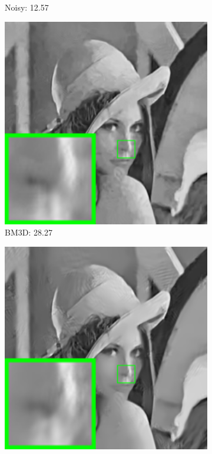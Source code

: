 \begin{figure}
\begin{adjustwidth}{-2cm}{}
\begin{subfigure}[t]{0.19\textwidth}
		\caption{Noisy: 12.57}
    \end{subfigure}
    \hfill
    \begin{subfigure}[t]{0.19\textwidth}
        \centering
        \includegraphics[width=1\textwidth]{images/twsc/awgn/resize_br_BM3D_60_lena.png}
		\caption{BM3D: 28.27}
    \end{subfigure}
    \hfill
    \begin{subfigure}[t]{0.19\textwidth}
        \centering
        \includegraphics[width=1\textwidth]{images/twsc/awgn/resize_br_LSSC_60_lena.png}

\end{subfigure}
\end{adjustwidth}
\end{figure}
